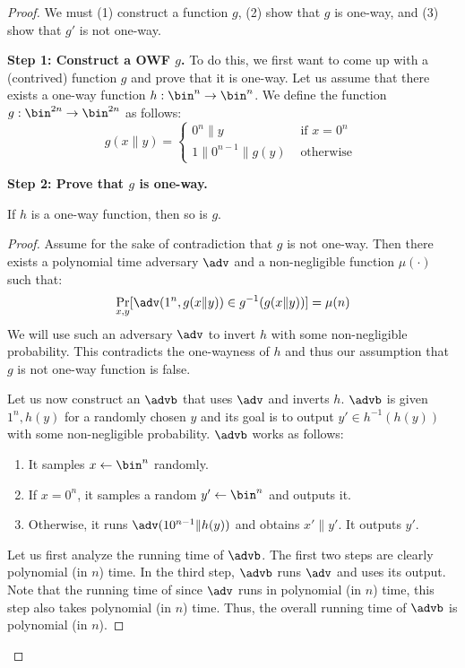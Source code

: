 \documentclass[12pt]{tufte-book}
\begin{document}
\begin{proof}
We must (1) construct a function $g$, (2) show that $g$ is one-way, and (3) show that $g'$ is not one-way.


\noindent\textbf{Step 1: Construct a OWF $g$.} 
To do this, we first want to come up with a (contrived) function $g$ and prove that it is one-way.
Let us assume that there exists a one-way function $h : \bin^n \rightarrow \bin^n$. We define the function $g : \bin^{2n} \rightarrow \bin^{2n}$ as follows:
$$
g(x\|y) = \begin{cases}
 0^{n}\|y &\text{    if } x = 0^n\\
1\|0^{n-1}\|g(y) &\text{    otherwise }
\end{cases}
$$

\noindent\textbf{Step 2: Prove that $g$ is one-way.}

\begin{claim}
If $h$ is a one-way function, then so is $g$.
\end{claim}
\begin{proof}
Assume for the sake of contradiction that $g$ is not one-way. Then there exists a polynomial time adversary $\adv$ and a non-negligible function $\mu(\cdot)$ such that:
$$
\Pr_{x,y}[\adv(1^n,g(x\|y)) \in g^{-1}(g(x\|y))] = \mu(n)
$$
We will use such an adversary $\adv$ to invert $h$ with some non-negligible probability. This contradicts the one-wayness of $h$ and thus our assumption that $g$ is not one-way function is false.

Let us now construct an $\advb$ that uses $\adv$ and inverts $h$. $\advb$ is given $1^n,h(y)$ for a randomly chosen $y$ and its goal is to output $y' \in h^{-1}(h(y))$ with some non-negligible probability. $\advb$ works as follows:
\begin{enumerate}
\item It samples $x \gets \bin^n$ randomly.
\item If $x = 0^n$, it samples a random $y' \gets \bin^n$ and outputs it.
\item Otherwise, it runs $\adv(10^{n-1}\|h(y))$ and obtains $x' \| y'$. It outputs $y'$.
\end{enumerate}

Let us first analyze the running time of $\advb$. The first two steps are clearly polynomial (in $n$) time. In the third step, $\advb$ runs $\adv$ and uses its output. Note that the running time of since $\adv$ runs in polynomial (in $n$) time, this step also takes polynomial (in $n$) time. Thus, the overall running time of $\advb$ is polynomial (in $n$).


\end{proof}
\end{proof}
\end{document}
